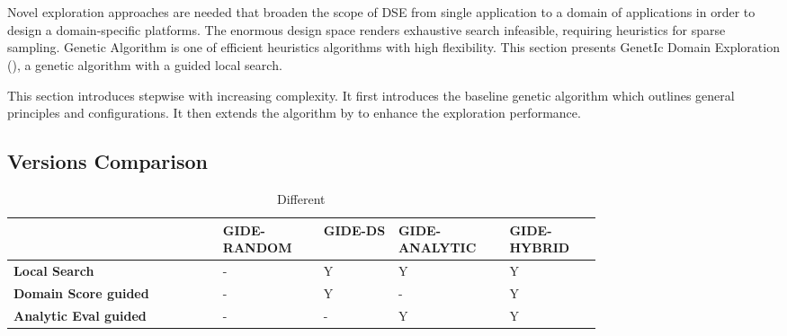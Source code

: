 \section{\ga}
\label{sec:GA}

Novel exploration approaches are needed that broaden the scope of DSE from single application to a domain of applications in order to design a domain-specific platforms. The enormous design space renders exhaustive search infeasible, requiring heuristics for sparse sampling. Genetic Algorithm is one of efficient heuristics algorithms with high flexibility. This section presents GenetIc Domain Exploration (\ga), a genetic algorithm with a guided local search.





This section introduces \ga stepwise with increasing complexity. It first introduces the baseline genetic algorithm \emph{\garand} which outlines general principles and configurations. It then extends the algorithm by  to enhance the exploration performance. 






\subsection{\ga Versions Comparison}

\begin{table}[h]
	\caption{Different \ga {}}
	\label{tab:GIDE}
	\centering
	\begin{tabular}{p{0.29\linewidth}|p{0.12\linewidth}|p{0.1\linewidth}|p{0.13\linewidth}|p{0.12\linewidth}}
		\toprule
		   & GIDE-RANDOM & GIDE-DS  & GIDE-ANALYTIC & GIDE-HYBRID \\
		\hline
		\midrule
		\textbf{Local Search} & - & Y & Y & Y \\
		\hline
		\textbf{Domain Score guided} & - & Y & - & Y \\
		\hline
		\textbf{Analytic Eval guided} & - & - & Y & Y \\
		\bottomrule
	\end{tabular}
\end{table}

